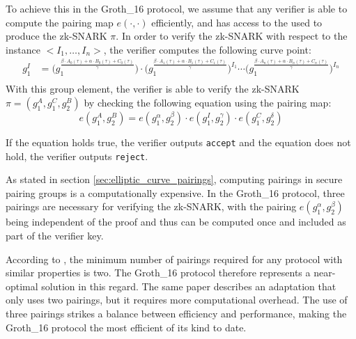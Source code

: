 To achieve this in the Groth\_16 protocol, we assume that any verifier is able to compute the pairing map $e(\cdot,\cdot)$ efficiently, and has access to the  used to produce the zk-SNARK $\pi$. In order to verify the zk-SNARK with respect to the instance $<I_1,\ldots, I_n>$, the verifier computes the following curve point:
\begin{align*}
g_1^I & = \Big(g_1^{\frac{\beta\cdot A_{0}(\tau)+\alpha\cdot B_{0}(\tau)+C_{0}(\tau)}{\gamma}}\Big)\cdot \Big(g_1^{\frac{\beta\cdot A_{1}(\tau)+\alpha\cdot B_{1}(\tau)+C_{1}(\tau)}{\gamma}}\Big)^{I_1} \cdots \Big(g_1^{\frac{\beta\cdot A_{n}(\tau)+\alpha\cdot B_{n}(\tau)+C_{n}(\tau)}{\gamma}}\Big)^{I_n}\\
\end{align*}
With this group element, the verifier is able to verify the zk-SNARK $\pi=(g_1^A,g_1^C,g_2^B)$ by checking the following equation using the pairing map:
\begin{equation}
\label{def:groth16-verifier-equation}
e(g_1^A, g_2^B) = e(g_1^\alpha,g_2^\beta)\cdot e(g_1^I,g_2^\gamma)\cdot e(g_1^C,g_2^\delta)
\end{equation}

If the equation holds true, the verifier outputs \texttt{accept} and the equation does not hold, the verifier outputs \texttt{reject}.

\begin{remark}
As stated in section \ref{sec:elliptic_curve_pairings}, computing pairings in secure pairing groups is a computationally expensive. In the Groth\_16 protocol, three pairings are necessary for verifying the zk-SNARK, with the pairing $e(g_1^\alpha,g_2^\beta)$ being independent of the proof and thus can be computed once and included as part of the verifier key.

According to \cite{Groth16}, the minimum number of pairings required for any protocol with similar properties is two. The Groth\_16 protocol therefore represents a near-optimal solution in this regard. The same paper describes an adaptation that only uses two pairings, but it requires more computational overhead. The use of three pairings strikes a balance between efficiency and performance, making the Groth\_16 protocol the most efficient of its kind to date.
\end{remark}

